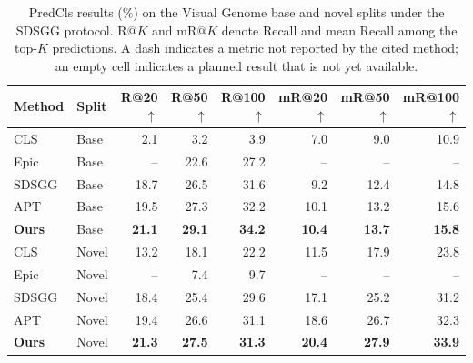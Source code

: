 \begin{table}[t]
\centering
\caption{PredCls results (\%) on the Visual Genome base and novel splits under the SDSGG protocol. $\mathrm{R}@K$ and $\mathrm{mR}@K$ denote Recall and mean Recall among the top-$K$ predictions. A dash indicates a metric not reported by the cited method; an empty cell indicates a planned result that is not yet available.}
\label{tab:vg_base_novel}
\small
\setlength{\tabcolsep}{5.0pt}
\begin{tabular}{llrrrrrr}
\toprule
Method & Split & R@20$\uparrow$ & R@50$\uparrow$ & R@100$\uparrow$ & mR@20$\uparrow$ & mR@50$\uparrow$ & mR@100$\uparrow$ \\
\midrule
CLS \cite{radford2021clip} & Base & 2.1 & 3.2 & 3.9 & 7.0 & 9.0 & 10.9 \\
Epic \cite{yu2023epic} & Base & -- & 22.6 & 27.2 & -- & -- & -- \\
SDSGG \cite{chen2024sdsgg} & Base & 18.7 & 26.5 & 31.6 & 9.2 & 12.4 & 14.8 \\
APT \cite{luo2026apt} & Base & 19.5 & 27.3 & 32.2 & 10.1 & 13.2 & 15.6 \\
\rowcolor{blue!6}\textbf{Ours} & Base & \textbf{21.1} & \textbf{29.1} & \textbf{34.2} & \textbf{10.4} & \textbf{13.7} & \textbf{15.8} \\
\midrule
CLS \cite{radford2021clip} & Novel & 13.2 & 18.1 & 22.2 & 11.5 & 17.9 & 23.8 \\
Epic \cite{yu2023epic} & Novel & -- & 7.4 & 9.7 & -- & -- & -- \\
SDSGG \cite{chen2024sdsgg} & Novel & 18.4 & 25.4 & 29.6 & 17.1 & 25.2 & 31.2 \\
APT \cite{luo2026apt} & Novel & 19.4 & 26.6 & 31.1 & 18.6 & 26.7 & 32.3 \\
\rowcolor{blue!6}\textbf{Ours} & Novel & \textbf{21.3} & \textbf{27.5} & \textbf{31.3} & \textbf{20.4} & \textbf{27.9} & \textbf{33.9} \\
\bottomrule
\end{tabular}
\end{table}
